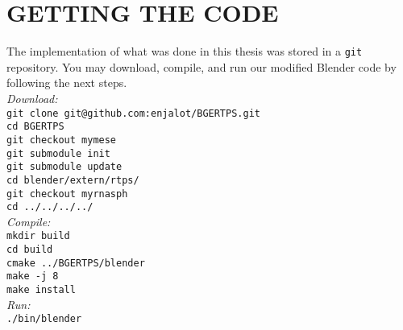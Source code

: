 \chapter{GETTING THE CODE}

The implementation of what was done in this thesis was stored in a \texttt{git} repository. You may download, compile, and run our modified Blender code by following the next steps. \\

\noindent
\textit{Download:} \\
\texttt{git clone git@github.com:enjalot/BGERTPS.git} \\
\texttt{cd BGERTPS} \\
\texttt{git checkout mymese} \\
\texttt{git submodule init} \\
\texttt{git submodule update} \\
\texttt{cd blender/extern/rtps/} \\
\texttt{git checkout myrnasph} \\
\texttt{cd ../../../../} \\

\noindent
\textit{Compile:} \\
\texttt{mkdir build} \\
\texttt{cd build} \\
\texttt{cmake ../BGERTPS/blender} \\
\texttt{make -j 8} \\
\texttt{make install} \\

\noindent
\textit{Run:} \\
\texttt{./bin/blender} \\


